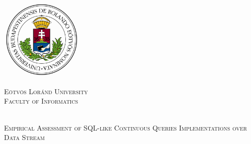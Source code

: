 \documentclass[a4paper,12pt,times,numbered,print,index]{Classes/PhDThesisPSnPDF}
\begin{document}
\frontmatter




\begin{titlepage}
	\begin{center}
		
		\begin{minipage}{0.3\textwidth}
			\includegraphics[width=4cm]{Figs/ELTE_logo.png}
		\end{minipage} \hfill
		\begin{minipage}{0.65\textwidth}
			\begin{flushright}
				\textsc{\Large Eötvös Loránd University} \\
				\textsc{\large Faculty of Informatics}
			\end{flushright}
		\end{minipage}
		\\[3cm]
		
		{\huge \vspace{0.5cm} \textsc{Empirical Assessment of SQL-like Continuous Queries Implementations 
over Data Stream  \\[3cm] }}
		

\end{center}
\end{titlepage}
\end{document}
